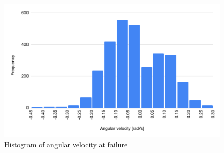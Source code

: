   \begin{figure}[h]
    \centering
    \includegraphics[keepaspectratio, scale=0.60] {images/RobotGuidance_failed_histogram.png}
    \captionsetup{justification=raggedright} %
    \caption{Histogram of angular velocity at failure}
    \label{Fig:RobotGuidance_failed_histogram}
  \end{figure}

\newpage
